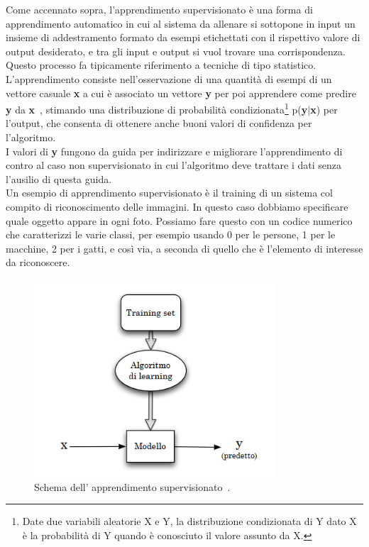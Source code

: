 Come accennato sopra, l’apprendimento supervisionato è una forma di apprendimento automatico
 in cui al sistema da allenare si sottopone in input un insieme di addestramento formato 
 da esempi
  etichettati con il rispettivo valore di output desiderato, e tra gli input e output
   si vuol trovare una corrispondenza.
   Questo processo fa tipicamente 
  riferimento a tecniche
  di tipo statistico. \\
L'apprendimento consiste nell’osservazione di una quantità di esempi di un vettore casuale 
\textbf{x} a cui è associato un vettore \textbf{y}  per poi apprendere come predire \textbf{y} 
da \textbf{x}~\cite{prob}, 
stimando una distribuzione
 di probabilità condizionata\footnote{Date due variabili aleatorie X e Y,
  la distribuzione condizionata di Y dato X è la probabilità di Y quando è conosciuto il valore 
  assunto da X.} p(\textbf{y}$\mid$\textbf{x}) per l'output, che consenta di ottenere 
  anche buoni valori di 
 confidenza per l'algoritmo. \\
 I valori di \textbf{y} fungono da guida per indirizzare e migliorare 
 l’apprendimento di contro al caso non supervisionato in cui l’algoritmo deve trattare i dati 
 senza l’ausilio di questa guida. \\
Un esempio di apprendimento supervisionato è  il training di un sistema
col compito di riconoscimento delle immagini.
In questo caso dobbiamo specificare quale oggetto appare in ogni foto.
Possiamo fare questo con un codice numerico che caratterizzi le varie classi, per esempio
usando 0 per le persone, 1 per le macchine, 2 per i gatti, e così via, a seconda di quello che
 è l'elemento di interesse da riconoscere.\\
 \begin{figure}[H]
  \centering
  \includegraphics[width=0.8\textwidth]{Figures/schema apprendimento supervisionato.png}
  \caption{\small{Schema dell' apprendimento supervisionato~\cite{img_learning}. 
  } %
  } %
  \label{fi:dcalc}
\end{figure}

